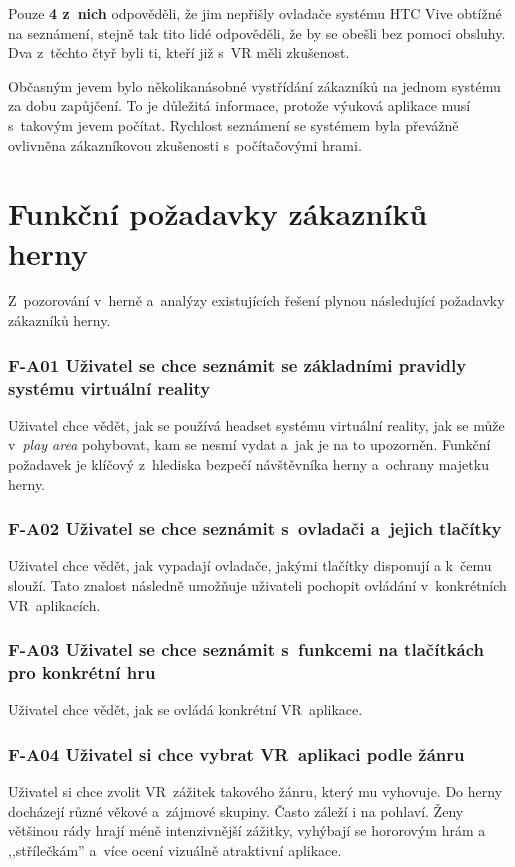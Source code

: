 Pouze \textbf{4 z~nich} odpověděli, že jim nepřišly ovladače systému HTC
Vive obtížné na seznámení, stejně tak tito lidé odpověděli, že by se
obešli bez pomoci obsluhy. Dva z~těchto čtyř byli ti, kteří již s~VR
měli zkušenost.

Občasným jevem bylo několikanásobné vystřídání zákazníků na jednom
systému za dobu zapůjčení. To je důležitá informace, protože výuková
aplikace musí s~takovým jevem počítat. Rychlost seznámení se systémem
byla převážně ovlivněna zákazníkovou zkušenosti s~počítačovými hrami.

\section{Funkční požadavky zákazníků
herny}\label{funkux10dnuxed-poux17eadavky-zakazniku-herny}

Z~pozorování v~herně a~analýzy existujících řešení plynou následující
požadavky zákazníků herny.

\subsubsection*{F-A01 Uživatel se chce seznámit se základními pravidly systému
virtuální reality}
Uživatel chce vědět, jak se používá headset systému virtuální reality,
jak se může v~\emph{play area} pohybovat, kam se nesmí vydat a~jak je na
to upozorněn. Funkční požadavek je klíčový z~hlediska bezpečí
návštěvníka herny a~ochrany majetku herny.

\subsubsection*{F-A02 Uživatel se chce seznámit s~ovladači a~jejich tlačítky}
Uživatel chce vědět, jak vypadají ovladače, jakými tlačítky disponují a
k~čemu slouží. Tato znalost následně umožňuje uživateli pochopit ovládání v~konkrétních VR~aplikacích.

\subsubsection*{F-A03 Uživatel se chce seznámit s~funkcemi na tlačítkách pro
konkrétní hru}
Uživatel chce vědět, jak se ovládá konkrétní VR~aplikace.

\subsubsection*{F-A04 Uživatel si chce vybrat VR~aplikaci podle žánru}
Uživatel si chce zvolit VR~zážitek takového žánru, který mu vyhovuje. Do
herny docházejí různé věkové a~zájmové skupiny. Často záleží i na
pohlaví. Ženy většinou rády hrají méně intenzivnější zážitky, vyhýbají
se hororovým hrám a ,,střílečkám'' a~více ocení vizuálně atraktivní
aplikace. \autocite{ladiespreferences}

